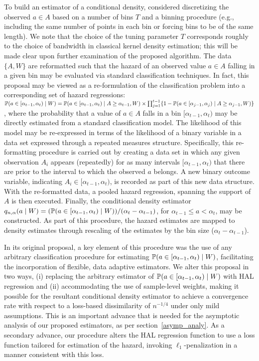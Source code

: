 To build an estimator of a conditional density, \citet{diaz2011super} considered
discretizing the observed $a \in A$ based on a number of bins $T$ and a binning
procedure (e.g., including the same number of points in each bin or forcing
bins to be of the same length). We note that the choice of the tuning parameter
$T$ corresponds roughly to the choice of bandwidth in classical kernel density
estimation; this will be made clear upon further examination of the proposed
algorithm. The data $\{A, W\}$ are reformatted such that the hazard of an
observed value $a \in A$ falling in a given bin may be evaluated via standard
classification techniques. In fact, this proposal may be viewed as
a re-formulation of the classification problem into a corresponding set of
hazard regressions:
$\mathbb{P} (a \in [\alpha_{t-1}, \alpha_t) \mid W) = \mathbb{P} (a \in [\alpha_{t-1},
\alpha_t) \mid A \geq \alpha_{t-1}, W) \times \prod_{j = 1}^{t -1} \{1 - \mathbb{P}
(a \in [\alpha_{j-1}, \alpha_j) \mid A \geq \alpha_{j-1}, W) \}$,
where the probability that a value of $a \in A$ falls in a bin $[\alpha_{t-1},
\alpha_t)$ may be directly estimated from a standard classification model. The
likelihood of this model may be re-expressed in terms of the likelihood of
a binary variable in a data set expressed through a repeated measures structure.
Specifically, this re-formatting procedure is carried out by creating a data set
in which any given observation $A_i$ appears (repeatedly) for as many intervals
$[\alpha_{t-1}, \alpha_t)$ that there are prior to the interval to which the
observed $a$ belongs. A new binary outcome variable, indicating $A_i \in
[\alpha_{t-1}, \alpha_t)$, is recorded as part of this new data structure. With
the re-formatted data, a pooled hazard regression, spanning the support of $A$
is then executed. Finally, the conditional density estimator
$q_{n, \alpha}(a \mid W) = (\mathbb{P}(a \in [\alpha_{t-1}, \alpha_t) \mid W)) /
(\alpha_t - \alpha_{t-1})$,
for $\alpha_{t-1} \leq a < \alpha_t$, may be constructed. As part of this
procedure, the hazard estimates are mapped to density estimates through
rescaling of the estimates by the bin size ($\alpha_t - \alpha_{t-1}$).

In its original proposal, a key element of this procedure was the use of any
arbitrary classification procedure for estimating $\mathbb{P}(a \in [\alpha_{t-1},
\alpha_t) \mid W)$, facilitating the incorporation of flexible, data adaptive
estimators. We alter this proposal in two ways, (i) replacing the arbitrary
estimator of $\mathbb{P}(a \in [\alpha_{t-1}, \alpha_t) \mid W)$ with HAL regression
and (ii) accommodating the use of sample-level weights, making it possible for
the resultant conditional density estimator to achieve a convergence rate with
respect to a loss-based dissimilarity of $n^{-1/4}$ under only mild assumptions.
This is an important advance that is needed for the asymptotic analysis of our
proposed estimators, as per section~\ref{asymp_analy}. As a secondary
advance, our procedure alters the HAL regression function to use a loss function
tailored for estimation of the hazard, invoking $\ell_1$-penalization in
a manner consistent with this loss.

